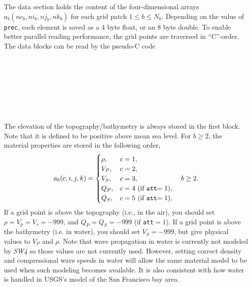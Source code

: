 \documentclass[11pt]{report}
\begin{document}
The data section holds the content of the four-dimensional arrays $a_b(nc_b,ni_b,nj_b,nk_b)$ for
each grid patch $1\leq b\leq N_b$. Depending on the value of {\tt prec}, each element is saved as a 4 byte
float, or an 8 byte double. To enable better parallel reading performance, the grid points are
traversed in ``C''-order. The data blocks can be read by the pseudo-C code
\begin{center}
\hspace{-35mm}{\tt for ($b=1$; $b\leq N_b$; $b$++) }\\ 
\hspace{-30mm}{\tt for ($i=1$; $i\leq ni_b$; $i$++) }\\ 
\hspace{-25mm}{\tt for ($j=1$; $j\leq nj_b$; $j$++) }\\ 
\hspace{-20mm}{\tt for ($k=1$; $k\leq nk_b$; $k$++) }\\ 
\hspace{-15mm}{\tt for ($c=1$; $c\leq nc_b$; $c$++) }\\
\hspace{-10mm}{\tt read $a_b(c,i,j,k)$}\\
\end{center}
The elevation of the topography/bathymetry is always stored in the first block. Note that it is
defined to be positive above mean sea level. For $b\geq 2$, the material properties are stored in
the following order,
\[
a_b(c,i,j,k) = \begin{cases}
\rho,&c=1,\\
V_P,& c=2,\\
V_S,& c=3,\\
Q_P,& c=4 \mbox{ (if {\tt att}$=1$)},\\
Q_S,& c=5 \mbox{ (if {\tt att}$=1$)},\\
\end{cases}\quad b\geq 2.
\]
If a grid point is above the topography (i.e., in the air), you should set $\rho=V_p=V_s=-999$, and
$Q_P=Q_S=-999$ (if {\tt att}$=1$). If a grid point is above the bathymetry (i.e. in water), you
should set $V_S=-999$, but give physical values to $V_P$ and $\rho$. Note that wave propagation in
water is currently not modeled by \emph{SW4} so those values are not currently used. However,
setting correct density and compressional wave speeds in water will allow the same material model to be
used when such modeling becomes available. It is also consistent with how water is handled in
USGS's model of the San Francisco bay area.
\end{document}
